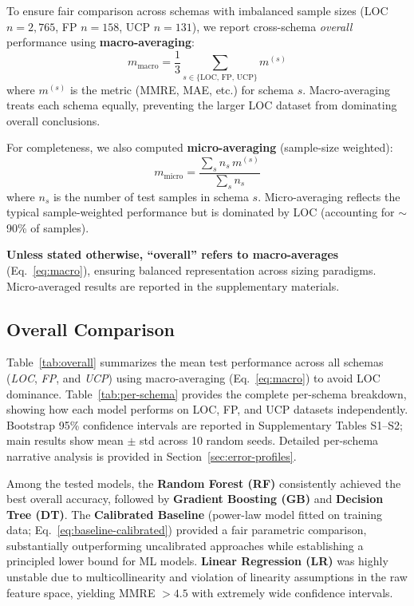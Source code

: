 \documentclass{ieeeaccess}
\begin{document}
To ensure fair comparison across schemas with imbalanced sample sizes 
(LOC $n{=}2{,}765$, FP $n{=}158$, UCP $n{=}131$), 
we report cross-schema \emph{overall} performance using \textbf{macro-averaging}:
\begin{equation}
m_{\text{macro}}=\frac{1}{3}\sum_{s\in\{\text{LOC, FP, UCP}\}} m^{(s)}
\label{eq:macro}
\end{equation}
where $m^{(s)}$ is the metric (MMRE, MAE, etc.) for schema $s$.
Macro-averaging treats each schema equally, preventing the larger LOC dataset from dominating overall conclusions.

For completeness, we also computed \textbf{micro-averaging} (sample-size weighted):
\begin{equation}
m_{\text{micro}}=\frac{\sum_{s} n_s\, m^{(s)}}{\sum_{s} n_s}
\label{eq:micro}
\end{equation}
where $n_s$ is the number of test samples in schema $s$. Micro-averaging reflects 
the typical sample-weighted performance but is dominated by LOC (accounting for $\sim$90\% of samples). 

\textbf{Unless stated otherwise, ``overall'' refers to macro-averages} (Eq.~\ref{eq:macro}), 
ensuring balanced representation across sizing paradigms. 
Micro-averaged results are reported in the supplementary materials.

\subsection{Overall Comparison}

Table~\ref{tab:overall} summarizes the mean test performance across all schemas 
(\textit{LOC}, \textit{FP}, and \textit{UCP}) using macro-averaging (Eq.~\ref{eq:macro}) 
to avoid LOC dominance. Table~\ref{tab:per-schema} provides the complete per-schema breakdown, 
showing how each model performs on LOC, FP, and UCP datasets independently. 
Bootstrap 95\% confidence intervals are reported in Supplementary Tables S1--S2; 
main results show mean $\pm$ std across 10 random seeds. 
Detailed per-schema narrative analysis is provided in Section~\ref{sec:error-profiles}.

Among the tested models, the \textbf{Random Forest (RF)} consistently achieved the best overall accuracy, 
followed by \textbf{Gradient Boosting (GB)} and \textbf{Decision Tree (DT)}. 
The \textbf{Calibrated Baseline} (power-law model fitted on training data; Eq.~\ref{eq:baseline-calibrated}) 
provided a fair parametric comparison, substantially outperforming uncalibrated approaches 
while establishing a principled lower bound for ML models.
\textbf{Linear Regression (LR)} was highly unstable due to multicollinearity 
and violation of linearity assumptions in the raw feature space, 
yielding MMRE $>4.5$ with extremely wide confidence intervals.
\end{document}
